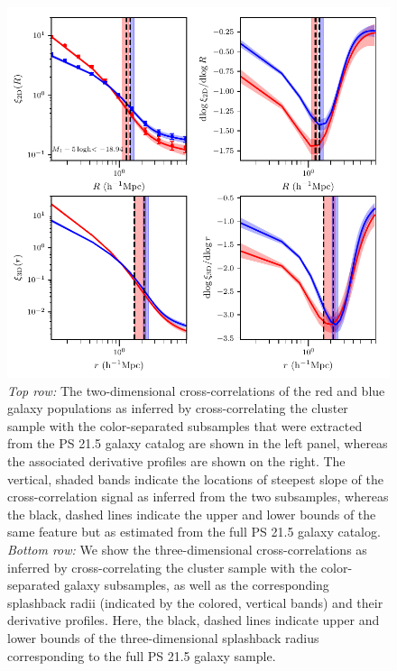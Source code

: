 \documentclass[iop, apjl, twocolappendix, numberedappendix]{emulateapj}
\begin{document}
\begin{figure}
    \includegraphics[scale=0.65]{color_separated.pdf}
\caption{\textit{Top row: } The two-dimensional cross-correlations
of the red and blue galaxy populations as inferred by
cross-correlating the cluster sample with the color-separated
subsamples that were extracted from the PS 21.5 galaxy catalog are
shown in the left panel, whereas the associated derivative profiles
are shown on the right. The vertical, shaded bands indicate the
locations of steepest slope of the cross-correlation signal as
inferred from the two subsamples, whereas the black, dashed lines
indicate the upper and lower bounds of the same feature but as
estimated from the full PS 21.5 galaxy catalog. \textit{Bottom row:
} We show the three-dimensional cross-correlations as
inferred by cross-correlating the cluster sample with the
color-separated galaxy subsamples, as well as the corresponding
splashback radii (indicated by the colored, vertical bands) and
their derivative profiles. Here, the black, dashed lines indicate
upper and lower bounds of the three-dimensional splashback radius
corresponding to the full PS 21.5 galaxy sample.}
   \label{fig:color_curve} 
\end{figure}
\end{document}
